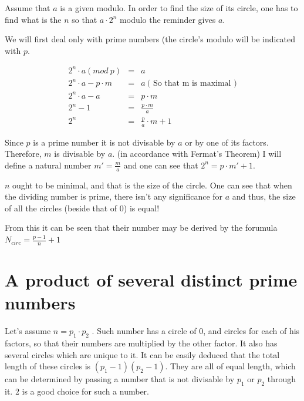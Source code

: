 \documentclass[a4paper]{report}
\begin{document}
Assume that $ a $ is a given modulo. In order to find the size of its
circle, one has to find what is the $ n $ so that $ a\cdot2^{n} $ modulo
the reminder gives $ a $.

We will first deal only with prime numbers (the circle's modulo will be
indicated with $ p $.

\begin{eqnarray*}
2^{n} \cdot a (mod ~ p) & = & a
\\
2^{n} \cdot a - p \cdot m & = & a  ~  \mbox{( So that m is maximal )}
\\
2^{n} \cdot a - a & = & p \cdot m
\\
2^{n} - 1 & = & \frac{p \cdot m}{a}
\\
2^{n} & = & \frac{p}{a} \cdot m + 1
\end{eqnarray*}

Since $ p $ is a prime number it is not divisable by $ a $ or by
one of its factors. Therefore, $ m $ is divisable by $ a $. (in accordance
with Fermat's Theorem) I will define a natural number $ m' = \frac{m}{a} $
and one can see that $ 2^{n} = p \cdot m' + 1 $.

$ n $ ought to be minimal, and that is the size of the circle. One can
see that when the dividing number is prime, there isn't any significance
for $ a $ and thus, the size of all the circles (beside that of 0) is
equal!

From this it can be seen that their number may be derived by the forumula
$ N_{circ}=\frac{p-1}{n}+1 $

\section{A product of several distinct prime numbers}

Let's assume $ n = p_{1} \cdot p_{2} $ . Such number has a circle of 0,
and circles for each of his factors, so that their numbers are multiplied
by the other factor. It also has several circles which are unique to it.
It can be easily deduced that the total length of these circles is
$ (p_{1} - 1)(p_{2} - 1) $. They are all of equal length, which can be determined
by passing a number that is not divisable by $ p_{1} $ or $ p_{2} $ through
it. 2 is a good choice for such a number.
\end{document}
